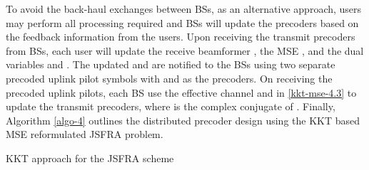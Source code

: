 To avoid the back-haul exchanges between \acp{BS}, as an alternative approach, users may perform all processing required and \acp{BS} will update the precoders based on the feedback information from the users. Upon receiving the transmit precoders from \acp{BS}, each user will update the receive beamformer , the \ac{MSE} , and the dual variables  and . The updated  and  are notified to the \acp{BS} using two separate precoded uplink pilot symbols with  and  as the precoders. On receiving the precoded uplink pilots, each \ac{BS} use the effective channel  and  in \eqref{kkt-mse-4.3} to update the transmit precoders, where  is the complex conjugate of . Finally, Algorithm \ref{algo-4} outlines the distributed precoder design using the \ac{KKT} based \ac{MSE} reformulated \ac{JSFRA} problem.
\begin{algorithm}
 \SetAlgoLined
 \DontPrintSemicolon
 \BlankLine
 \caption{\ac{KKT} approach for the \ac{JSFRA} scheme}
 \label{algo-4}
\end{algorithm}

